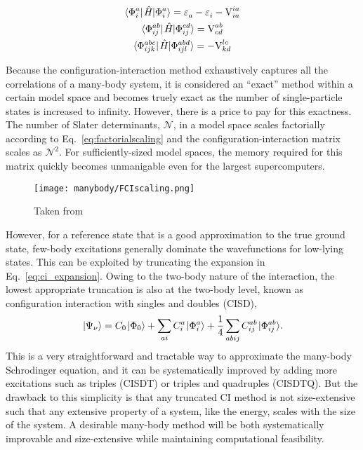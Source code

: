 \documentclass[thesis.tex]{subfiles}
\begin{document}
\begin{gather}
  \element{\Phi^{a}_{i}}{\Ham}{\Phi^{a}_{i}} = \Edenom{}{a} - \Edenom{}{i} - \vint{ia}{ia} \\
  \element{\Phi^{ab}_{ij}}{\Ham}{\Phi^{cd}_{ij}} = \vint{ab}{cd} \\
  \element{\Phi^{abc}_{ijk}}{\Ham}{\Phi^{abd}_{ijl}} = -\vint{lc}{kd}
\end{gather}

Because the configuration-interaction method exhaustively captures all the correlations of a many-body system, it is considered an ``exact'' method within a certain model space and becomes truely exact as the number of single-particle states is increased to infinity.  However, there is a price to pay for this exactness.  The number of Slater determinants, $\mathcal{N}$, in a model space scales factorially according to Eq.\ \eqref{eq:factorialscaling} and the configuration-interaction matrix scales as $\mathcal{N}^{2}$.  For sufficiently-sized model spaces, the memory required for this matrix quickly becomes unmanigable even for the largest supercomputers.
\begin{figure}
  \centering
  \texttt{[image: manybody/FCIscaling.png]}
  \caption{Taken from \cite{SHAO2016}}
  \label{fig:fciscaling}
\end{figure}

However, for a reference state that is a good approximation to the true ground state, few-body excitations generally dominate the wavefunctions for low-lying states.  This can be exploited by truncating the expansion in Eq.\ \eqref{eq:ci_expansion}.  Owing to the two-body nature of the interaction, the lowest appropriate truncation is also at the two-body level, known as configuration interaction with singles and doubles (CISD),
\begin{equation} \label{eq:cisd_expansion}
  \ket{\Psi_{\nu}} = C_{0}\ket{\Phi_{0}} + \sum_{\mathclap{a i}} C^{a}_{i}\ket{\Phi^{a}_{i}} + \frac{1}{4}\sum_{\mathclap{a b i j}} C^{ab}_{ij}\ket{\Phi^{ab}_{ij}}.
\end{equation}
This is a very straightforward and tractable way to approximate the many-body Schrodinger equation, and it can be systematically improved by adding more excitations such as triples (CISDT) or triples and quadruples (CISDTQ).  But the drawback to this simplicity is that any truncated CI method is not size-extensive such that any extensive property of a system, like the energy, scales with the size of the system.  A desirable many-body method will be both systematically improvable and size-extensive while maintaining computational feasibility.
\end{document}
